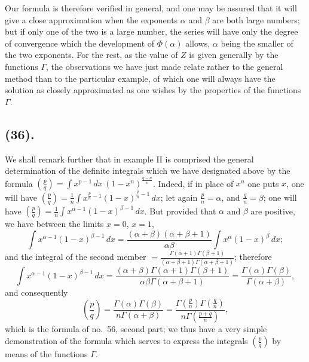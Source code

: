 \documentclass{article}
\begin{document}

Our formula is therefore verified in general, and one may be assured that it will give a close approximation when the exponents $\alpha$ and $\beta$ are both large numbers; but if only one of the two is a large number, the series will have only the degree of convergence which the development of $\Phi(\alpha)$ allows, $\alpha$ being the smaller of the two exponents. For the rest, as the value of $Z$ is given generally by the functions $\Gamma$, the observations we have just made relate rather to the general method than to the particular example, of which one will always have the solution as closely approximated as one wishes by the properties of the functions $\Gamma$.

\subsection*{(36).}

We shall remark further that in example II is comprised the general determination of the definite integrals which we have designated above by the formula $\left(\frac{p}{q}\right)=\displaystyle\int x^{p-1}\,dx\,(1-x^{n})^{\frac{q-n}{n}}$. Indeed, if in place of $x^{n}$ one puts $x$, one will have $\left(\frac{p}{q}\right)=\frac{1}{n}\displaystyle\int x^{\frac{p}{n}-1}(1-x)^{\frac{q}{n}-1}\,dx$; let again $\frac{p}{n}=\alpha$, and $\frac{q}{n}=\beta$; one will have $\left(\frac{p}{q}\right)=\frac{1}{n}\displaystyle\int x^{\alpha-1}(1-x)^{\beta-1}\,dx$. But provided that $\alpha$ and $\beta$ are positive, we have between the limits $x=0$, $x=1$,
\[ \int x^{\alpha-1}(1-x)^{\beta-1}\,dx=\frac{(\alpha+\beta)(\alpha+\beta+1)}{\alpha\beta}\int x^{\alpha}(1-x)^{\beta}\,dx; \]
and the integral of the second member $=\frac{\Gamma(\alpha+1)\Gamma(\beta+1)}{(\alpha+\beta+1)\Gamma(\alpha+\beta+1)}$; therefore
\[ \int x^{\alpha-1}(1-x)^{\beta-1}\,dx=\frac{(\alpha+\beta)\Gamma(\alpha+1)\Gamma(\beta+1)}{\alpha\beta\Gamma(\alpha+\beta+1)}=\frac{\Gamma(\alpha)\Gamma(\beta)}{\Gamma(\alpha+\beta)}, \]
and consequently
\[ \left(\frac{p}{q}\right)=\frac{\Gamma(\alpha)\Gamma(\beta)}{n\Gamma(\alpha+\beta)}=\frac{\Gamma\left(\frac{p}{n}\right)\Gamma\left(\frac{q}{n}\right)}{n\Gamma\left(\frac{p+q}{n}\right)}, \]
which is the formula of no.\ 56, second part; we thus have a very simple demonstration of the formula which serves to express the integrals $\left(\frac{p}{q}\right)$ by means of the functions $\Gamma$.

\end{document}
